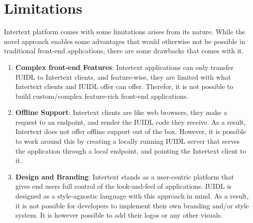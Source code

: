 \section{Limitations}

Intertext platform comes with some limitations arises from its nature. While the novel approach enables some advantages that would otherwise not be possible in traditional front-end applications, there are some drawbacks that comes with it. 

\begin{enumerate}

    \item \textbf{Complex front-end Features}: Intertext applications can only transfer IUIDL to Intertext clients, and feature-wise, they are limited with what Intertext clients and IUIDL offer can offer. Therefor, it is not possible to build custom/complex feature-rich front-end applications.

    \item \textbf{Offline Support}: Intertext clients are like web browsers, they make a request to an endpoint, and render the IUIDL code they receive. As a result, Intertext does not offer offline support out of the box. However, it is possible to work around this by creating a locally running IUIDL server that serves the application through a local endpoint, and pointing the Intertext client to it.
    
    \item \textbf{Design and Branding}: Intertext stands as a user-centric platform that gives end users full control of the look-and-feel of applications. IUIDL is designed as a style-agnostic language with this approach in mind. As a result, it is not possible for developers to implement their own branding and/or style system. It is however possible to add their logos or any other visuals.
    

\end{enumerate}
